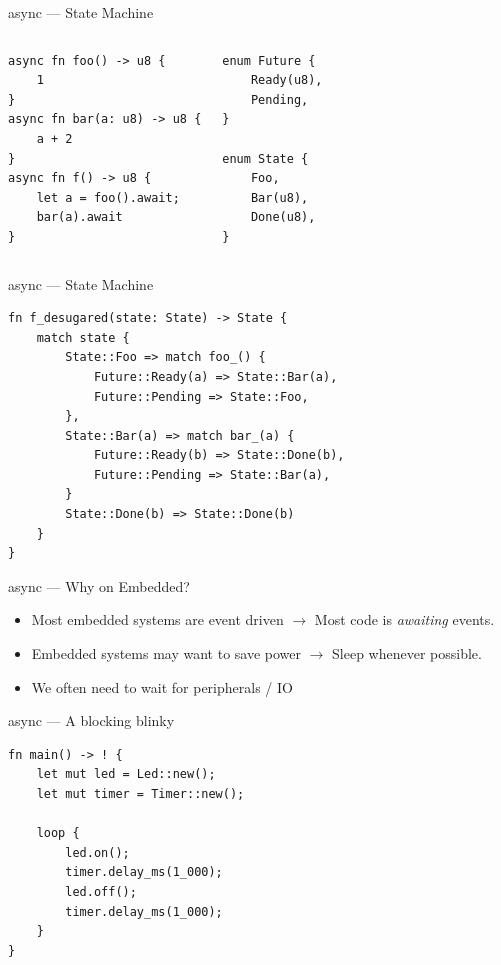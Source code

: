 \documentclass[aspectratio=1610,14pt,t]{beamer}
\begin{document}
\begin{frame}[c,fragile]{async --- State Machine}
  \begin{columns}[t,onlytextwidth]
  \begin{verbatim}
async fn foo() -> u8 {
    1
}
async fn bar(a: u8) -> u8 {
    a + 2
}
async fn f() -> u8 {
    let a = foo().await;
    bar(a).await
}
	\end{verbatim}
  \pause{}
  \begin{verbatim}
enum Future {
    Ready(u8),
    Pending,
}

enum State {
    Foo,
    Bar(u8),
    Done(u8),
}
  \end{verbatim}
	\end{columns}
\end{frame}

\begin{frame}[c,fragile]{async --- State Machine}
  \begin{verbatim}
fn f_desugared(state: State) -> State {
    match state {
        State::Foo => match foo_() {
            Future::Ready(a) => State::Bar(a),
            Future::Pending => State::Foo,
        },
        State::Bar(a) => match bar_(a) {
            Future::Ready(b) => State::Done(b),
            Future::Pending => State::Bar(a),
        }
        State::Done(b) => State::Done(b)
    }
}
  \end{verbatim}
\end{frame}

\begin{frame}[c]{async --- Why on Embedded?}
  \begin{itemize}
    \item Most embedded systems are event driven $\rightarrow$ Most code is
      \emph{awaiting} events.
    \item Embedded systems may want to save power $\rightarrow$ Sleep whenever
      possible.
		\item We often need to wait for peripherals / IO
  \end{itemize}
\end{frame}

\begin{frame}[c,fragile]{async --- A blocking blinky}
  \begin{verbatim}
fn main() -> ! {
    let mut led = Led::new();
    let mut timer = Timer::new();

    loop {
        led.on();
        timer.delay_ms(1_000);
        led.off();
        timer.delay_ms(1_000);
    }
}
  \end{verbatim}
\end{frame}
\end{document}
